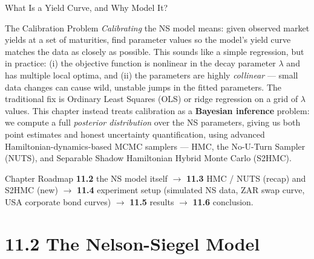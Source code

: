\documentclass[aspectratio=169,10pt]{beamer}
\begin{document}
\begin{frame}[allowframebreaks]{What Is a Yield Curve, and Why Model It?}
\begin{block}{The Calibration Problem}
  \emph{Calibrating} the NS model means: given observed market yields at a
  set of maturities, find parameter values so the model's yield curve
  matches the data as closely as possible. This sounds like a simple
  regression, but in practice: (i) the objective function is nonlinear in
  the decay parameter $\lambda$ and has multiple local optima, and (ii) the
  parameters are highly \emph{collinear} --- small data changes can cause
  wild, unstable jumps in the fitted parameters. The traditional fix is
  Ordinary Least Squares (OLS) or ridge regression on a grid of $\lambda$
  values. This chapter instead treats calibration as a \textbf{Bayesian
  inference} problem: we compute a full \emph{posterior distribution} over
  the NS parameters, giving us both point estimates and honest uncertainty
  quantification, using advanced Hamiltonian-dynamics-based MCMC samplers
  --- HMC, the No-U-Turn Sampler (NUTS), and Separable Shadow Hamiltonian
  Hybrid Monte Carlo (S2HMC).
\end{block}

\begin{alertblock}{Chapter Roadmap}
  \textbf{11.2} the NS model itself $\to$ \textbf{11.3} HMC / NUTS (recap)
  and S2HMC (new) $\to$ \textbf{11.4} experiment setup (simulated NS data,
  ZAR swap curve, USA corporate bond curves) $\to$ \textbf{11.5} results
  $\to$ \textbf{11.6} conclusion.
\end{alertblock}

\end{frame}

\section{11.2 The Nelson-Siegel Model}
\end{document}
